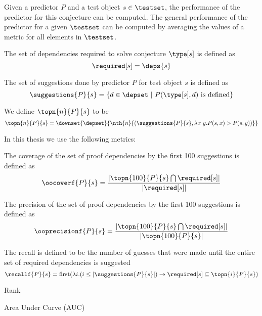 Given a predictor $P$ and a test object $s \in \testset$,
the performance of the predictor for this conjecture can be computed.
The general performance of the predictor for a given $\testset$
can be computed by averaging the values of a metric for all elements in $\testset$.

\begin{definition} The set of dependencies required to solve conjecture $\type[s]$ is defined as
  \[ \required[s] = \deps{s} \]
\end{definition}

\begin{definition} The set of suggestions done by predictor $P$ for test object $s$ is defined as
  \[ \suggestions{P}{s} = \{ d \in \depset ~|~ P(\type[s], d) ~\text{is defined} \} \]
\end{definition}

\begin{definition} We define $\topn{n}{P}{s}$ to be
  \[ \topn{n}{P}{s} = \downset{\depset}{\nth{n}{(\suggestions{P}{s}, \lambda x~y. P(s, x) > P(s, y))}} \]
\end{definition}

In this thesis we use the following metrics:
\begin{definition}
  The coverage of the set of proof dependencies by the first 100 suggestions is defined as
  \[ \oocoverf{P}{s} = \frac{ |\topn{100}{P}{s} \bigcap \required[s]| } { |\required[s]| } \]
\end{definition}

\begin{definition}
  The precision of the set of proof dependencies by the first 100 suggestions is defined as
  \[ \ooprecisionf{P}{s} = \frac{ |\topn{100}{P}{s} \bigcap \required[s]| } { |\topn{100}{P}{s}| } \]
\end{definition}

\begin{definition}
  The recall is defined to be the number of guesses that were made until the entire set of required dependencies is suggested
  \[ \recallf{P}{s} =  \text{first}(\lambda i. (i \leq |\suggestions{P}{s}|) \rightarrow \required[s] \subseteq \topn{i}{P}{s}) \]
\end{definition}

\begin{definition}{Rank}
\end{definition}

\begin{definition}{Area Under Curve (AUC)}
\end{definition}
